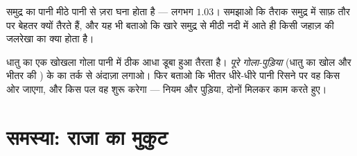 \begin{exercise}[$\star\star$]\label{exo:g6:density-floating:11}
समुद्र का पानी मीठे पानी से ज़रा घना होता है --- लगभग $1.03$। समझाओ कि
तैराक समुद्र में साफ़ तौर पर बेहतर क्यों तैरते हैं, और यह भी बताओ कि
खारे समुद्र से मीठी नदी में आते ही किसी जहाज़ की जलरेखा का क्या होता
है।
\end{exercise}

\begin{exercise}[$\star\star\star$]\label{exo:g6:density-floating:12}
धातु का एक खोखला गोला पानी में ठीक आधा डूबा हुआ तैरता है।
\emph{पूरे गोला-पुड़िया} (धातु का खोल और भीतर की ) के  का तर्क
से अंदाज़ा लगाओ। फिर बताओ कि भीतर धीरे-धीरे पानी रिसने पर वह किस ओर
जाएगा, और किस पल वह  शुरू करेगा --- नियम और पुड़िया, दोनों मिलकर
काम करते हुए।
\end{exercise}

\section{समस्या: राजा का मुकुट}

